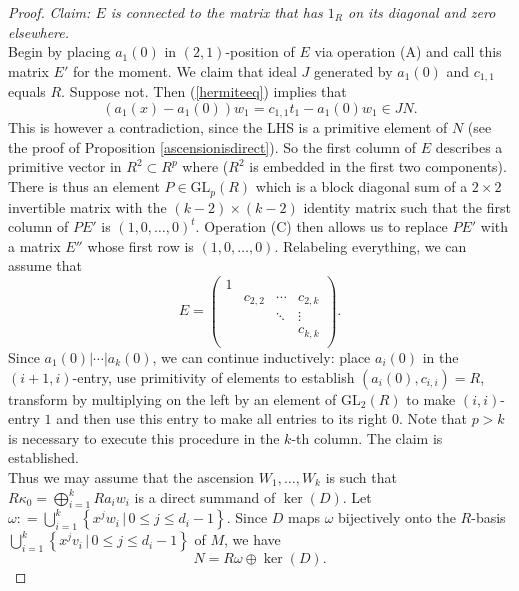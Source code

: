 \documentclass[ALCO, Unicode]{cedram}
\newcommand{\GL}{\mathrm{GL}}
\begin{document}
\begin{proof}
\noindent \textit{Claim:  $ E $ is connected to the matrix that has $ 1_{R} $ on its diagonal and zero elsewhere.} \\
Begin by placing $ a_{1}(0) $ in $ (2, 1) $-position of $ E $ via operation (A) and call this matrix $ E '$ for the moment.  We claim that ideal $ J $  generated by $ a_{1} (0) $ and $ c_{1,1} $ equals $ R $. Suppose not.  
Then  (\ref{hermiteeq})  implies that $$ \left ( a_{1}(x) - a_{1}(0) \right ) w_{1} = c_{1,1} t_{1} -  a_{1}(0) w_{1}  \in J N . $$ 
This is however a contradiction, since the LHS is a primitive element of $ N $ (see the proof of Proposition \ref{ascensionisdirect}). So the first column of $ E $ describes a primitive vector in $ R^{2} \subset  R^{p} $ where ($ R^{2} $ is embedded in the first two components).   There is thus an element $ P \in  \GL_{p}(R) $ which is a block diagonal sum of a $ 2 \times 2 $ invertible matrix with the $ (k-2) \times (k-2)$ identity matrix such that the first column of $ PE' $ is $ (1,0, \ldots, 0)^{t} $. Operation (C) then allows us to replace $ PE' $ with a matrix $ E'' $ whose first row is $ (1, 0, \ldots, 0) $. Relabeling everything, we can assume that $$ E =      \left (  \begin{matrix} 1  &   & %
&  \\
& c_{2,2} & \cdots & c_{2,k} \\
 &  &  \ddots & \vdots  \\
 &  & & c_{k,k} \\
 & 
\end{matrix}  \right   )  . $$
Since $ a_{1}(0) | \cdots | a_{k}(0) $, we can continue inductively:   place $ a_{i}(0) $ in the $ (i+1, i)$-entry, use primitivity of elements to establish $ (a_{i}(0), c_{i,i}) = R $, transform by multiplying on the left by an element of $ \GL_{2}(R) $ to make $ (i,i)$-entry $ 1 $ and then use this entry to make all entries to its right $ 0 $. Note that $ p > k $ is necessary to execute this procedure in the $ k $-th  column.    The claim  is   established.   \\[1em] 
Thus we may assume that the ascension $ W_{1} ,  \ldots , W_{k } $ is such that $ R \kappa_{0} = \bigoplus_{i=1}^{k} R a_{i}w_{i}  $ is a direct summand of $ \ker(D) $. Let 
$ \omega  : =  \bigcup_{i=1}^{k} \left \{  x^{j} w_{i} \, | \, 0 \leq j \leq d_{i} -1 \right \} $. Since $ D $ maps $\omega $ bijectively onto the $ R$-basis $ \bigcup_{i=1}^k \left \{ x^{j} v_{i} \, | \, 0 \leq j \leq d_{i}-1     \right \} $ of $ M $,  we have $$ N =  R \omega  \oplus \ker (D)   . $$ 

\end{proof}
\end{document}
